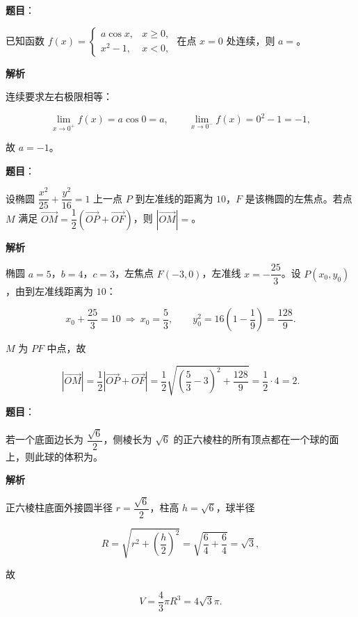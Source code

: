 \begin{answer}

\textbf{题目}：

已知函数 $f(x)=\begin{cases}a\cos x,&x\geqslant0,\\ x^2-1,&x<0,\end{cases}$ 在点 $x=0$ 处连续，则 $a=$\gkblank{}。

\textbf{解析}

连续要求左右极限相等：

\nopagebreak[4]
\[\lim_{x\to0^+}f(x)=a\cos0=a,\qquad \lim_{x\to0^-}f(x)=0^2-1=-1,\]

故 $a=-1$。


\end{answer}
\begin{answer}

\textbf{题目}：

设椭圆 $\dfrac{x^2}{25}+\dfrac{y^2}{16}=1$ 上一点 $P$ 到左准线的距离为 $10$，$F$ 是该椭圆的左焦点。若点 $M$ 满足 $\overrightarrow{OM}=\dfrac12\left(\overrightarrow{OP}+\overrightarrow{OF}\right)$，则 $|\overrightarrow{OM}|=$\gkblank{}。

\textbf{解析}

椭圆 $a=5$，$b=4$，$c=3$，左焦点 $F(-3,0)$，左准线 $x=-\dfrac{25}3$。设 $P(x_0,y_0)$，由到左准线距离为 $10$：

\nopagebreak[4]
\[x_0+\frac{25}3=10\ \Rightarrow\ x_0=\frac53,\qquad y_0^2=16\left(1-\frac1{9}\right)=\frac{128}9.\]

$M$ 为 $PF$ 中点，故

\nopagebreak[4]
\[|\overrightarrow{OM}|=\frac12\left|\overrightarrow{OP}+\overrightarrow{OF}\right|=\frac12\sqrt{\left(\frac53-3\right)^2+\frac{128}9}=\frac12\cdot4=2.\]


\end{answer}
\begin{answer}

\textbf{题目}：

若一个底面边长为 $\dfrac{\sqrt6}{2}$，侧棱长为 $\sqrt6$ 的正六棱柱的所有顶点都在一个球的面上，则此球的体积为\gkblank{}。

\textbf{解析}

正六棱柱底面外接圆半径 $r=\dfrac{\sqrt6}2$，柱高 $h=\sqrt6$，球半径

\nopagebreak[4]
\[R=\sqrt{r^2+\left(\frac h2\right)^2}=\sqrt{\frac64+\frac64}=\sqrt3,\]

故

\nopagebreak[4]
\[V=\frac43\pi R^3=4\sqrt3\pi.\]


\end{answer}
